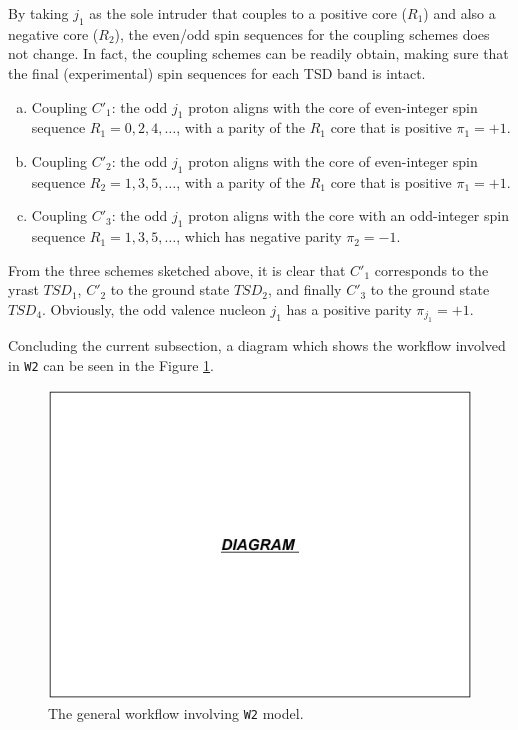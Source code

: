 \documentclass[11pt]{article}
\begin{document}
By taking $j_1$ as the sole intruder that couples to a positive core ($R_1$) and also a negative core ($R_2$), the even/odd spin sequences for the coupling schemes does not change. In fact, the coupling schemes can be readily obtain, making sure that the final (experimental) spin sequences for each TSD band is intact. 

\begin{enumerate}[(a)]
    \item Coupling $C'_1$: the odd $j_1$ proton aligns with the core of even-integer spin sequence $R_1=0,2,4,\dots$, with a parity of the $R_1$ core that is positive $\pi_1=+1$.
    \item Coupling $C'_2$: the odd $j_1$ proton aligns with the core of even-integer spin sequence $R_2=1,3,5,\dots$, with a parity of the $R_1$ core that is positive $\pi_1=+1$.
    \item Coupling $C'_3$: the odd $j_1$ proton aligns with the core with an odd-integer spin sequence $R_1=1,3,5,\dots$, which has negative parity $\pi_2=-1$.
\end{enumerate}

From the three schemes sketched above, it is clear that $C'_1$ corresponds to the yrast $TSD_1$, $C'_2$ to the ground state $TSD_2$, and finally $C'_3$ to the ground state $TSD_4$. Obviously, the odd valence nucleon $j_1$ has a positive parity $\pi_{j_1}=+1$. 

Concluding the current subsection, a diagram which shows the workflow involved in \texttt{W2} can be seen in the Figure \ref{w2-model-worfklow}.

\begin{figure}
    \centering
    \includegraphics[scale=0.65]{figs/W1_W2_models.pdf}
    \caption{The general workflow involving \texttt{W2} model.}
    \label{w2-model-worfklow}
\end{figure}
\end{document}
